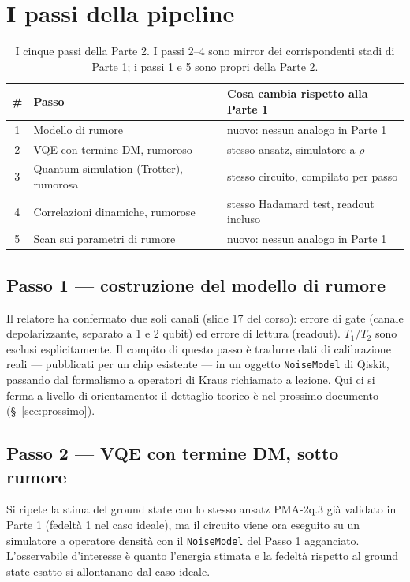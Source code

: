 \documentclass[11pt,a4paper]{article}
\begin{document}
\section{I passi della pipeline}

\begin{table}[htbp]
\centering
\begin{tabular}{@{}cll@{}}
\toprule
\# & Passo & Cosa cambia rispetto alla Parte 1 \\
\midrule
1 & Modello di rumore & nuovo: nessun analogo in Parte 1 \\
2 & VQE con termine DM, rumoroso & stesso ansatz, simulatore a $\rho$ \\
3 & Quantum simulation (Trotter), rumorosa & stesso circuito, compilato per passo \\
4 & Correlazioni dinamiche, rumorose & stesso Hadamard test, readout incluso \\
5 & Scan sui parametri di rumore & nuovo: nessun analogo in Parte 1 \\
\bottomrule
\end{tabular}
\caption{I cinque passi della Parte 2. I passi 2--4 sono mirror dei corrispondenti
stadi di Parte 1; i passi 1 e 5 sono propri della Parte 2.}
\end{table}
\FloatBarrier

\subsection{Passo 1 --- costruzione del modello di rumore}

Il relatore ha confermato due soli canali (slide 17 del corso): errore di gate
(canale depolarizzante, separato a 1 e 2 qubit) ed errore di lettura (readout).
$T_1$/$T_2$ sono esclusi esplicitamente. Il compito di questo passo è tradurre dati di
calibrazione reali --- pubblicati per un chip esistente --- in un oggetto
\texttt{NoiseModel} di Qiskit, passando dal formalismo a operatori di Kraus richiamato
a lezione. Qui ci si ferma a livello di orientamento: il dettaglio teorico è nel
prossimo documento (\S~\ref{sec:prossimo}).

\subsection{Passo 2 --- VQE con termine DM, sotto rumore}

Si ripete la stima del ground state con lo stesso ansatz PMA-2q.3 già validato in Parte
1 (fedeltà 1 nel caso ideale), ma il circuito viene ora eseguito su un simulatore a
operatore densità con il \texttt{NoiseModel} del Passo 1 agganciato. L'osservabile
d'interesse è quanto l'energia stimata e la fedeltà rispetto al ground state esatto si
allontanano dal caso ideale.
\end{document}
